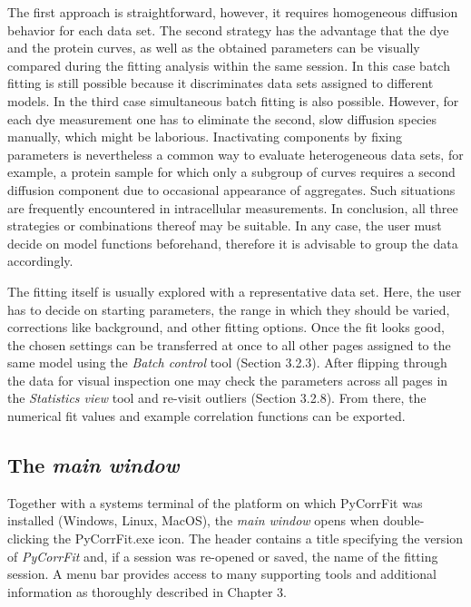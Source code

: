 The first approach is straightforward, however, it requires homogeneous diffusion behavior for each data set. The second strategy has the advantage that the dye and the protein curves, as well as the obtained parameters can be visually compared during the fitting analysis within the same session. In this case batch fitting is still possible because it discriminates data sets assigned to different models. In the third case simultaneous batch fitting is also possible. However, for each dye measurement one has to eliminate the second, slow diffusion species manually, which might be laborious. Inactivating components by fixing parameters is nevertheless a common way to evaluate heterogeneous data sets, for example, a protein sample for which only a subgroup of curves requires a second diffusion component due to occasional appearance of aggregates. Such situations are frequently encountered in intracellular measurements. In conclusion, all three strategies or combinations thereof may be suitable. In any case, the user must decide on model functions beforehand, therefore it is advisable to group the data accordingly.

The fitting itself is usually explored with a representative data set. Here, the user has to decide on starting parameters, the range in which they should be varied, corrections like background, and other fitting options. Once the fit looks good, the chosen settings can be transferred at once to all other pages assigned to the same model using the \textit{Batch control} tool (Section 3.2.3). After flipping through the data for visual inspection one may check the parameters across all pages in the \textit{Statistics view} tool and re-visit outliers (Section 3.2.8). From there, the numerical fit values and example correlation functions can be exported.

\subsection{The \textit{main window}}

Together with a system{\textquotesingle}s terminal of the platform on which PyCorrFit was installed (Windows, Linux, MacOS), the \textit{main window} opens when double-clicking the PyCorrFit.exe icon. The header contains a title specifying the version of \textit{PyCorrFit} and, if a session was re-opened or saved, the name of the fitting session. A menu bar provides access to many supporting tools and additional information as thoroughly described in Chapter 3. 


